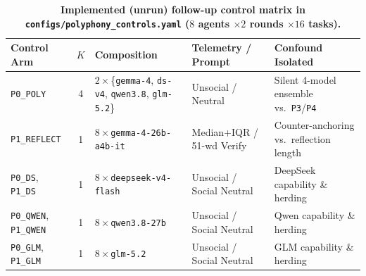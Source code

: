 \documentclass[11pt,letterpaper]{article}
\theoremstyle{plain}
\newcommand{\code}[1]{\nolinkurl{#1}}
\begin{document}
\begin{table}[t]
\centering
\caption{\textbf{Implemented (unrun) follow-up control matrix in \code{configs/polyphony\_controls.yaml} ($8$ agents $\times 2$ rounds $\times 16$ tasks).}}
\label{tab:control-roadmap}
\scriptsize
\setlength{\tabcolsep}{3.0pt}
\begin{tabular}{@{}l c l l l@{}}
\toprule
\textbf{Control Arm} & \textbf{$K$} & \textbf{Composition} & \textbf{Telemetry / Prompt} & \textbf{Confound Isolated} \\
\midrule
\code{P0\_POLY} & 4 & $2\times$\{\texttt{gemma-4}, \texttt{ds-v4}, \texttt{qwen3.8}, \texttt{glm-5.2}\} & Unsocial / Neutral & Silent 4-model ensemble vs.\ \texttt{P3}/\texttt{P4} \\
\code{P1\_REFLECT} & 1 & $8\times$\texttt{gemma-4-26b-a4b-it} & Median+IQR / 51-wd Verify & Counter-anchoring vs.\ reflection length \\
\code{P0\_DS}, \code{P1\_DS} & 1 & $8\times$\texttt{deepseek-v4-flash} & Unsocial / Social Neutral & DeepSeek capability \& herding \\
\code{P0\_QWEN}, \code{P1\_QWEN} & 1 & $8\times$\texttt{qwen3.8-27b} & Unsocial / Social Neutral & Qwen capability \& herding \\
\code{P0\_GLM}, \code{P1\_GLM} & 1 & $8\times$\texttt{glm-5.2} & Unsocial / Social Neutral & GLM capability \& herding \\
\bottomrule
\end{tabular}
\end{table}
\end{document}
